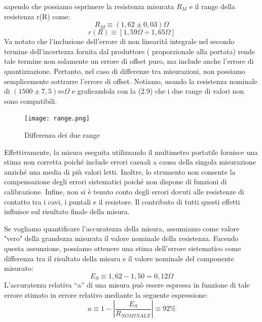 sapendo che possiamo esprimere la resistenza misurata $R_M$ e il range della resistenza r(R) come:
\begin{equation*}
    R_M \equiv(1,62 \pm 0,03) \Omega
\end{equation*}
\begin{equation*}
    r(R) \equiv [1,59 \Omega \div 1,65 \Omega]
\end{equation*}
Va notato che l'inclusione dell'errore di non linearit\'a integrale nel secondo termine dell'incertezza fornita dal produttore ( proporzionale alla portata) rende tale termine non solamente un errore di offset puro, ma include anche l'errore di quantizzazione. Pertanto, nel caso di differenze tra misurazioni, non possiamo semplicemente sottrarre l'errore di offset.
Notiamo, usando la resistenza nominale di $(1500 \pm 7,5) m\Omega$ e graficandola con la (2.9) che i due range di valori non sono compatibili.

\begin{figure}[h]
    \centering
    \texttt{[image: range.png]}
    \caption{Differenza dei due range}
    \label{fig:range}
\end{figure}
\FloatBarrier

Effettivamente, la misura eseguita utilizzando il multimetro portatile fornisce una stima non corretta poiché include errori casuali a causa della singola misurazione anziché una media di più valori letti. Inoltre, lo strumento non consente la compensazione degli errori sistematici poiché non dispone di funzioni di calibrazione. Infine, non si è tenuto conto degli errori dovuti alle resistenze di contatto tra i cavi, i puntali e il resistore. Il contributo di tutti questi effetti influisce sul risultato finale della misura.

Se vogliamo quantificare l'accuratezza della misura, assumiamo come valore "vero" della grandezza misurata il valore nominale della resistenza. Facendo questa assunzione, possiamo ottenere una stima dell'errore sistematico come differenza tra il risultato della misura e il valore nominale del componente misurato:
\begin{equation}
    E_S \equiv 1,62 - 1,50 = 0,12\Omega
\end{equation}
L’accuratezza relativa “a” di una misura può essere espressa in funzione di tale errore 
stimato in errore relativo mediante la seguente espressione: 
\begin{equation}
     a \equiv 1 - \left| \frac{E_S}{R_{NOMINALE}}\right| \equiv 92\%
\end{equation}


